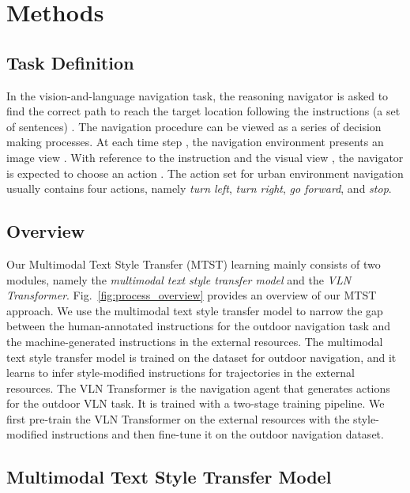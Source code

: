 \documentclass[11pt,a4paper]{article}
\begin{document}
\section{Methods}


\subsection{Task Definition}

In the vision-and-language navigation task, the reasoning navigator is asked to find the correct path to reach the target location following the instructions (a set of sentences) .
The navigation procedure can be viewed as a series of decision making processes. At each time step , the navigation environment presents an image view . With reference to the instruction  and the visual view , the navigator is expected to choose an action . The action set  for urban environment navigation usually contains four actions, namely \textit{turn left}, \textit{turn right}, \textit{go forward}, and \textit{stop}. 



\subsection{Overview}
\label{sec:overview}
Our Multimodal Text Style Transfer (MTST) learning mainly consists of two modules, namely the \emph{multimodal text style transfer model} and the \emph{VLN Transformer}. Fig.~\ref{fig:process_overview} provides an overview of our MTST approach. 
We use the multimodal text style transfer model to narrow the gap between the human-annotated instructions for the outdoor navigation task and the machine-generated instructions in the external resources. The multimodal text style transfer model is trained on the dataset for outdoor navigation, and it learns to infer style-modified instructions for trajectories in the external resources. 
The VLN Transformer is the navigation agent that generates actions for the outdoor VLN task. It is trained with a two-stage training pipeline. We first pre-train the VLN Transformer on the external resources with the style-modified instructions and then fine-tune it on the outdoor navigation dataset.

\subsection{Multimodal Text Style Transfer Model}
\label{sec:mm_text_style_transfer}
\end{document}
